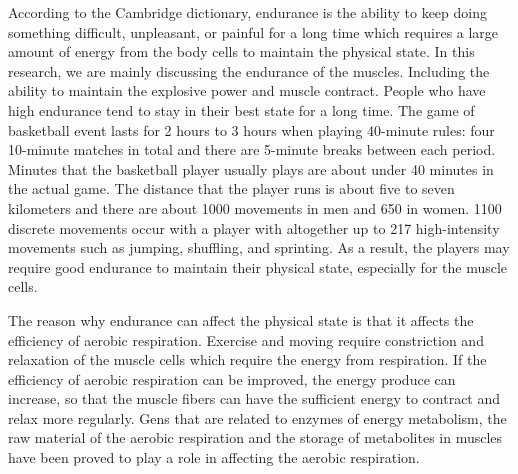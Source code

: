 \documentclass{article}
\begin{document}
According to the Cambridge dictionary, endurance is the ability to keep doing something difficult, unpleasant, or painful for a long time which requires a large amount of energy from the body cells to maintain the physical state. In this research, we are mainly discussing the endurance of the muscles. Including the ability to maintain the explosive power and muscle contract. People who have high endurance tend to stay in their best state for a long time. The game of basketball event lasts for 2 hours to 3 hours when playing 40-minute rules: four 10-minute matches in total and there are 5-minute breaks between each period. Minutes that the basketball player usually plays are about under 40 minutes in the actual game. The distance that the player runs is about five to seven kilometers and there are about 1000 movements in men and 650 in women. 1100 discrete movements occur with a player with altogether up to 217 high-intensity movements such as jumping, shuffling, and sprinting.\autocite[13-14]{raduScienceBasketball2018} As a result, the players may require good endurance to maintain their physical state, especially for the muscle cells. 

The reason why endurance can affect the physical state is that it affects the efficiency of aerobic respiration.\autocite{forsmanh.KoripalloilijanFyysinenHarjoittelu2024} Exercise and moving require constriction and relaxation of the muscle cells which require the energy from respiration. If the efficiency of aerobic respiration can be improved, the energy produce can increase, so that the muscle fibers can have the sufficient energy to contract and relax more regularly. Gens that are related to enzymes of energy metabolism, the raw material of the aerobic respiration and the storage of metabolites in muscles have been proved to play a role in affecting the aerobic respiration.\autocite{ahmetovGenesAthleticPerformance2016}
\end{document}
